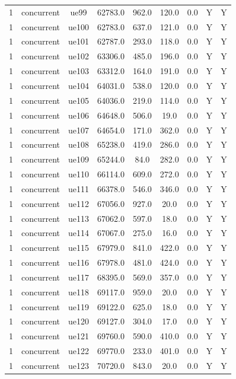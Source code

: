 \begin{table}[ht]
\begin{tabular}{|c|c|c|c|c|c|c|c|c|}
1 & concurrent & ue99 & 62783.0 & 962.0 & 120.0 & 0.0 & Y & Y \\
1 & concurrent & ue100 & 62783.0 & 637.0 & 121.0 & 0.0 & Y & Y \\
1 & concurrent & ue101 & 62787.0 & 293.0 & 118.0 & 0.0 & Y & Y \\
1 & concurrent & ue102 & 63306.0 & 485.0 & 196.0 & 0.0 & Y & Y \\
1 & concurrent & ue103 & 63312.0 & 164.0 & 191.0 & 0.0 & Y & Y \\
1 & concurrent & ue104 & 64031.0 & 538.0 & 120.0 & 0.0 & Y & Y \\
1 & concurrent & ue105 & 64036.0 & 219.0 & 114.0 & 0.0 & Y & Y \\
1 & concurrent & ue106 & 64648.0 & 506.0 & 19.0 & 0.0 & Y & Y \\
1 & concurrent & ue107 & 64654.0 & 171.0 & 362.0 & 0.0 & Y & Y \\
1 & concurrent & ue108 & 65238.0 & 419.0 & 286.0 & 0.0 & Y & Y \\
1 & concurrent & ue109 & 65244.0 & 84.0 & 282.0 & 0.0 & Y & Y \\
1 & concurrent & ue110 & 66114.0 & 609.0 & 272.0 & 0.0 & Y & Y \\
1 & concurrent & ue111 & 66378.0 & 546.0 & 346.0 & 0.0 & Y & Y \\
1 & concurrent & ue112 & 67056.0 & 927.0 & 20.0 & 0.0 & Y & Y \\
1 & concurrent & ue113 & 67062.0 & 597.0 & 18.0 & 0.0 & Y & Y \\
1 & concurrent & ue114 & 67067.0 & 275.0 & 16.0 & 0.0 & Y & Y \\
1 & concurrent & ue115 & 67979.0 & 841.0 & 422.0 & 0.0 & Y & Y \\
1 & concurrent & ue116 & 67978.0 & 481.0 & 424.0 & 0.0 & Y & Y \\
1 & concurrent & ue117 & 68395.0 & 569.0 & 357.0 & 0.0 & Y & Y \\
1 & concurrent & ue118 & 69117.0 & 959.0 & 20.0 & 0.0 & Y & Y \\
1 & concurrent & ue119 & 69122.0 & 625.0 & 18.0 & 0.0 & Y & Y \\
1 & concurrent & ue120 & 69127.0 & 304.0 & 17.0 & 0.0 & Y & Y \\
1 & concurrent & ue121 & 69760.0 & 590.0 & 410.0 & 0.0 & Y & Y \\
1 & concurrent & ue122 & 69770.0 & 233.0 & 401.0 & 0.0 & Y & Y \\
1 & concurrent & ue123 & 70720.0 & 843.0 & 20.0 & 0.0 & Y & Y \\

\end{tabular}
\end{table}
